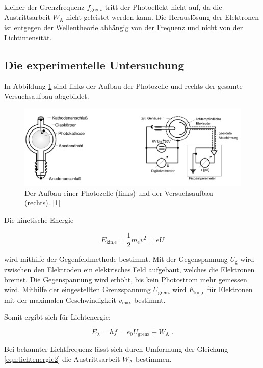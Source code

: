 kleiner der Grenzfrequenz $f_\text{grenz}$ tritt der Photoeffekt nicht auf, da die Austrittsarbeit $W_\text{A}$
nicht geleistet werden kann. 
Die Herauslösung der Elektronen ist entgegen der Wellentheorie abhängig von der Frequenz und nicht
von der Lichtintensität.

\subsection{Die experimentelle Untersuchung}

In Abbildung \ref{fig:bild1} sind links der Aufbau der Photozelle und rechts der gesamte Versuchsaufbau abgebildet.

\begin{figure}
    \centering
    \includegraphics[scale=0.37]{content/bild1.png}
    \caption{Der Aufbau einer Photozelle (links) und der Versuchsaufbau (rechts). [1]}
    \label{fig:bild1}
\end{figure}

  Die kinetische Energie

\begin{equation}
    E_\text{kin,e} = \frac{1}{2} m_\text{e} v^2 = e U
    \label{eqn:Ekin}
\end{equation}

  wird mithilfe der Gegenfeldmethode bestimmt. Mit der Gegenspannung $U_\text{g}$ wird zwischen
  den Elektroden ein elektrisches Feld aufgebaut, welches die Elektronen bremst.
  Die Gegenspannung wird erhöht, bis kein Photostrom mehr gemessen wird. Mithilfe der 
  eingestellten Grenzspannung $U_\text{grenz}$ wird $E_\text{kin,e}$ für Elektronen
  mit der maximalen Geschwindigkeit $v_\text{max}$ bestimmt.

  Somit ergibt sich für Lichtenergie:

\begin{equation}
    E_\lambda = h f = e_0 U_\text{grenz} + W_\text{A} \; .
    \label{eqn:lichtenergie2}
\end{equation}

 Bei bekannter Lichtfrequenz lässt sich durch Umformung der Gleichung \eqref{eqn:lichtenergie2} die
 Austrittsarbeit $W_\text{A}$ bestimmen.

